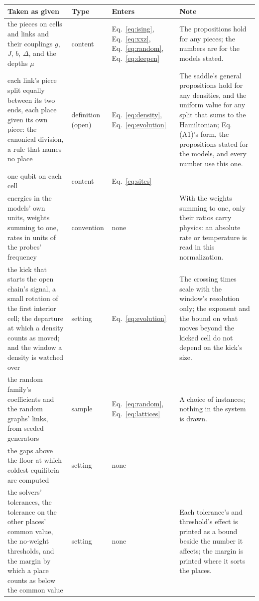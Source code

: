 \begin{tabular}{p{2.3in}lp{1.2in}p{2.3in}}
\toprule
\raggedright Taken as given & Type & \raggedright Enters & \raggedright Note \tabularnewline
\midrule
\raggedright the pieces on cells and links and their couplings $g$, $J$, $b$, $\Delta$, and the depths $\mu$ & content & \raggedright Eq.~\eqref{eq:ising}, Eq.~\eqref{eq:xxz}, Eq.~\eqref{eq:random}, Eq.~\eqref{eq:deepen} & \raggedright The propositions hold for any pieces; the numbers are for the models stated. \tabularnewline
\raggedright each link's piece split equally between its two ends, each place given its own piece: the canonical division, a rule that names no place & definition (open) & \raggedright Eq.~\eqref{eq:density}, Eq.~\eqref{eq:evolution} & \raggedright The saddle's general propositions hold for any densities, and the uniform value for any split that sums to the Hamiltonian; Eq. (A1)'s form, the propositions stated for the models, and every number use this one. \tabularnewline
\raggedright one qubit on each cell & content & \raggedright Eq.~\eqref{eq:sites} & \raggedright  \tabularnewline
\raggedright energies in the models' own units, weights summing to one, rates in units of the probes' frequency & convention & \raggedright none & \raggedright With the weights summing to one, only their ratios carry physics: an absolute rate or temperature is read in this normalization. \tabularnewline
\raggedright the kick that starts the open chain's signal, a small rotation of the first interior cell; the departure at which a density counts as moved; and the window a density is watched over & setting & \raggedright Eq.~\eqref{eq:evolution} & \raggedright The crossing times scale with the window's resolution only; the exponent and the bound on what moves beyond the kicked cell do not depend on the kick's size. \tabularnewline
\raggedright the random family's coefficients and the random graphs' links, from seeded generators & sample & \raggedright Eq.~\eqref{eq:random}, Eq.~\eqref{eq:lattices} & \raggedright A choice of instances; nothing in the system is drawn. \tabularnewline
\raggedright the gaps above the floor at which coldest equilibria are computed & setting & \raggedright none & \raggedright  \tabularnewline
\raggedright the solvers' tolerances, the tolerance on the other places' common value, the no-weight thresholds, and the margin by which a place counts as below the common value & setting & \raggedright none & \raggedright Each tolerance's and threshold's effect is printed as a bound beside the number it affects; the margin is printed where it sorts the places. \tabularnewline

\end{tabular}
